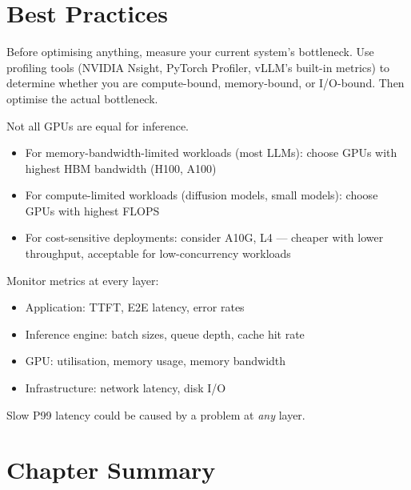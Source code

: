 \documentclass[12pt, twoside, openright]{book}
\begin{document}
\section{Best Practices}

\begin{tipbox}
Before optimising anything, measure your current system's bottleneck.
Use profiling tools (NVIDIA Nsight, PyTorch Profiler, vLLM's built-in
metrics) to determine whether you are compute-bound, memory-bound,
or I/O-bound. Then optimise the actual bottleneck.
\end{tipbox}

\begin{tipbox}
Not all GPUs are equal for inference.
\begin{itemize}
  \item For memory-bandwidth-limited workloads (most LLMs): choose
        GPUs with highest HBM bandwidth (H100, A100)
  \item For compute-limited workloads (diffusion models, small models):
        choose GPUs with highest FLOPS
  \item For cost-sensitive deployments: consider A10G, L4 --- cheaper
        with lower throughput, acceptable for low-concurrency workloads
\end{itemize}
\end{tipbox}

\begin{tipbox}
Monitor metrics at every layer:
\begin{itemize}
  \item Application: TTFT, E2E latency, error rates
  \item Inference engine: batch sizes, queue depth, cache hit rate
  \item GPU: utilisation, memory usage, memory bandwidth
  \item Infrastructure: network latency, disk I/O
\end{itemize}
Slow P99 latency could be caused by a problem at \textit{any} layer.
\end{tipbox}

\section{Chapter Summary}
\end{document}
